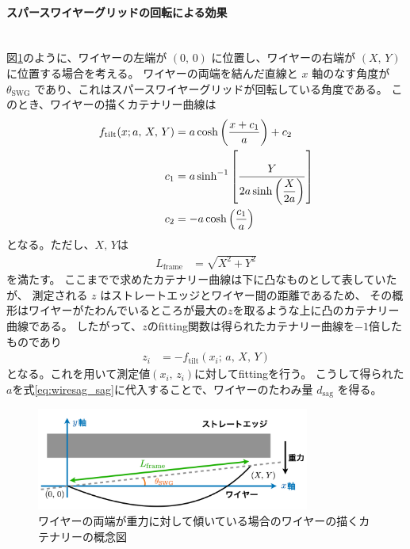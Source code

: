 \documentclass[../../main.tex]{subfiles}
\begin{document}
\paragraph{スパースワイヤーグリッドの回転による効果}\quad\\
\indent
図\ref{fig:wiresag_concept_tilt}のように、ワイヤーの左端が $(0,\,0)$ に位置し、ワイヤーの右端が $(X,\,Y)$ に位置する場合を考える。
ワイヤーの両端を結んだ直線と $x$ 軸のなす角度が $\theta_{\mathrm{SWG}}$ であり、これはスパースワイヤーグリッドが回転している角度である。
このとき、ワイヤーの描くカテナリー曲線は
\begin{align}
    \label{eq:wiresag_catenary_tilt}
    f_{\mathrm{tilt}}(x;a,\,X,\,Y) &= a\cosh\qty(\dfrac{x+c_1}{a}) + c_2 \\
    c_1 &= a\sinh^{-1}\qty[\dfrac{Y}{2a\sinh\qty(\dfrac{X}{2a})}] \\
    c_2 &= -a\cosh\qty(\dfrac{c_1}{a})
\end{align}
となる。ただし、$X,\,Y$は
\begin{align}
    L_{\mathrm{frame}} &= \sqrt{X^2+Y^2}
\end{align}
を満たす。
ここまでで求めたカテナリー曲線は下に凸なものとして表していたが、
測定される $z$ はストレートエッジとワイヤー間の距離であるため、
その概形はワイヤーがたわんでいるところが最大の$z$を取るような上に凸のカテナリー曲線である。
したがって、$z$のfitting関数は得られたカテナリー曲線を$-1$倍したものであり
\begin{align}
    z_{i} &= -f_{\mathrm{tilt}}(x_{i};\,a,\,X,\,Y)
\end{align}
となる。これを用いて測定値$(x_{i},\,z_{i})$に対してfittingを行う。
こうして得られた$a$を式\eqref{eq:wiresag_sag}に代入することで、ワイヤーのたわみ量 $d_{\mathrm{sag}}$ を得る。
\begin{figure}[H]
    \centering
    \includegraphics[width=0.8\textwidth]{wiresag/wire_catenary_tilt.pdf}
    \caption{ワイヤーの両端が重力に対して傾いている場合のワイヤーの描くカテナリーの概念図}
    \label{fig:wiresag_concept_tilt}
\end{figure}
\end{document}
